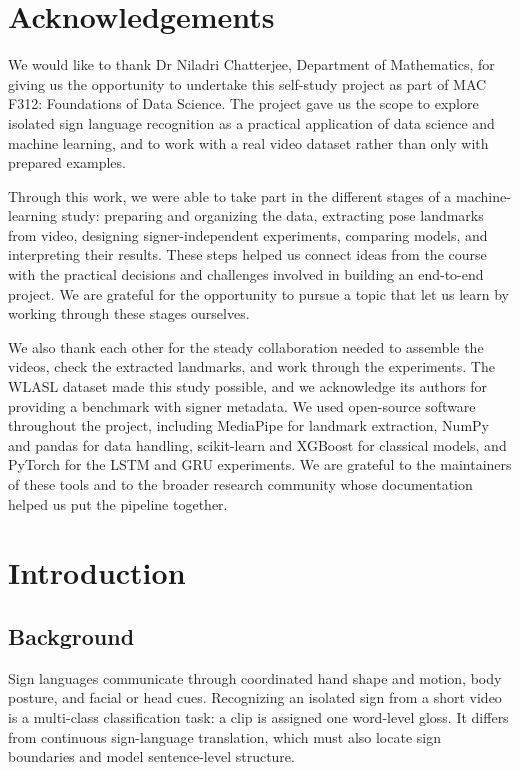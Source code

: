 \documentclass[12pt,a4paper,oneside]{report}
\newcommand{\course}{MAC F312: Foundations of Data Science}
\begin{document}
\chapter*{Acknowledgements}
We would like to thank Dr Niladri Chatterjee, Department of Mathematics, for giving us the opportunity to undertake this self-study project as part of \course. The project gave us the scope to explore isolated sign language recognition as a practical application of data science and machine learning, and to work with a real video dataset rather than only with prepared examples.

Through this work, we were able to take part in the different stages of a machine-learning study: preparing and organizing the data, extracting pose landmarks from video, designing signer-independent experiments, comparing models, and interpreting their results. These steps helped us connect ideas from the course with the practical decisions and challenges involved in building an end-to-end project. We are grateful for the opportunity to pursue a topic that let us learn by working through these stages ourselves.

We also thank each other for the steady collaboration needed to assemble the videos, check the extracted landmarks, and work through the experiments. The WLASL dataset made this study possible, and we acknowledge its authors for providing a benchmark with signer metadata. We used open-source software throughout the project, including MediaPipe for landmark extraction, NumPy and pandas for data handling, scikit-learn and XGBoost for classical models, and PyTorch for the LSTM and GRU experiments. We are grateful to the maintainers of these tools and to the broader research community whose documentation helped us put the pipeline together.

\tableofcontents
\listoffigures
\listoftables
\clearpage
{}
\renewcommand{\thepage}{\arabic{page}}
\setcounter{page}{1}

\chapter{Introduction}
\section{Background}
Sign languages communicate through coordinated hand shape and motion, body posture, and facial or head cues. Recognizing an isolated sign from a short video is a multi-class classification task: a clip is assigned one word-level gloss. It differs from continuous sign-language translation, which must also locate sign boundaries and model sentence-level structure.
\end{document}
